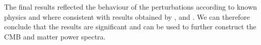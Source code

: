 \documentclass[twocolumn]{aastex62}
\begin{document}
The final results reflected the behaviour of the perturbations according to known physics and where consistent with results obtained by \cite{winther:2020b}, \cite{dodelson:2003} and \cite{baumann:2014}. We can therefore conclude that the results are significant and can be used to further construct the CMB and matter power spectra.

\newpage


\end{document}
